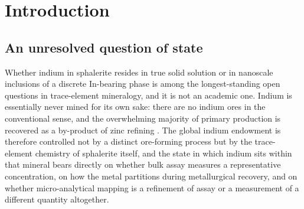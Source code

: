 \documentclass[11pt,a4paper]{article}
\newcommand{\RCuIn}{R_{\mathrm{Cu\text{-}In}}}
\begin{document}
\begin{abstract}
Two subsidiary results bear on how trace-element data are read. The pair
enrichment factor $\RCuIn$ rises sixteenfold across the composition scan while
the quantity it describes --- the copper content of the first shell around
indium --- falls slightly; the apparent variation lies almost entirely in a
normalisation whose ceiling is $1/x_{\rm Cu}$, an artefact available to be
misread in any dataset spanning orders of magnitude in tenor. And the internal
structure of the condensed domain is independent of bulk composition to within
a surface correction, so the object that forms is the same at every
concentration examined, differing only in size.

The conclusion that the equilibrium state is condensed does not depend on the
one class of parameter left unconstrained by first-principles calculation:
electrostatics alone gives a sixteenfold enrichment, and removing the chemical
term strengthens the claim rather than weakening it, since the resulting energy
landscape is smoother. Ideal dilute-mixing entropy, assumed in conventional
partition-coefficient models, is therefore not available at ore-forming
temperatures. Whether a natural sphalerite grain attains this equilibrium state
is a question of kinetics --- of interfacial barriers and arrest during cooling
--- and is the subject of a companion study.
\end{abstract}

\section{Introduction}
\label{sec:intro}

\subsection{An unresolved question of state}

Whether indium in sphalerite resides in true solid solution or in nanoscale
inclusions of a discrete In-bearing phase is among the longest-standing open
questions in trace-element mineralogy, and it is not an academic one. Indium is
essentially never mined for its own sake: there are no indium ores in the
conventional sense, and the overwhelming majority of primary production is
recovered as a by-product of zinc refining \citep{werner2015,usgs2024}. The
global indium endowment is therefore controlled not by a distinct ore-forming
process but by the trace-element chemistry of sphalerite itself, and the state
in which indium sits within that mineral bears directly on whether bulk assay
measures a representative concentration, on how the metal partitions during
metallurgical recovery, and on whether micro-analytical mapping is a refinement
of assay or a measurement of a different quantity altogether.
\end{document}
